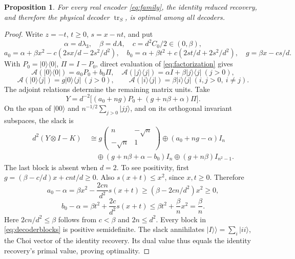 \documentclass[11pt]{article}
\newcommand{\tr}{\operatorname{tr}}
\newcommand{\ket}[1]{\lvert#1\rangle}
\newcommand{\bra}[1]{\langle#1\rvert}
\newtheorem{proposition}{Proposition}
\begin{document}
\begin{proposition}\label{prop:decoder}
For every real encoder \eqref{eq:family}, the identity reduced recovery,
and therefore the physical decoder $\tr_S$, is optimal among all decoders.
\end{proposition}
\begin{proof}
Write $z=-t$, $t\ge0$, $s=x-nt$, and put
\[
 \alpha=d\lambda_3,\quad\beta=dA,\quad c=d^2C_0/2\in(0,\beta),
\]
\[
 a_0=\alpha+\beta x^2-c(2sx/d-2s^2/d^2),\quad
 b_0=\alpha+\beta t^2+c(2st/d+2s^2/d^2),\quad
 g=\beta x-cs/d.
\]
With $P_0=\ket0\bra0$, $\Pi=I-P_0$, direct evaluation of
\eqref{eq:factorization} gives
\[
 \mathcal A(\ket0\bra0)=a_0P_0+b_0\Pi,\quad
 \mathcal A(\ket j\bra j)=\alpha I+\beta\ket j\bra j\ (j>0),
\]
\[
 \mathcal A(\ket0\bra j)=g\ket0\bra j\ (j>0),\qquad
 \mathcal A(\ket i\bra j)=\beta\ket i\bra j\ (i,j>0,\ i\ne j).
\]
The adjoint relations determine the remaining matrix units. Take
\begin{equation}\label{eq:Y}
 Y=d^{-2}\big[(a_0+ng)P_0+(g+n\beta+\alpha)\Pi\big].
\end{equation}
On the span of $\ket{00}$ and $n^{-1/2}\sum_{j>0}\ket{jj}$,
and on its orthogonal invariant subspaces, the slack is
\begin{equation}\label{eq:decoderblocks}
 \begin{aligned}
 d^2(Y\otimes I-K)\ &\cong
 g\begin{pmatrix}n&-\sqrt n\\-\sqrt n&1\end{pmatrix}
 \oplus(a_0+ng-\alpha)I_n\\
 &\quad\oplus(g+n\beta+\alpha-b_0)I_n
 \oplus(g+n\beta)I_{n^2-1}.
 \end{aligned}
\end{equation}
The last block is absent when $d=2$. To see positivity, first
$g=(\beta-c/d)x+cnt/d\ge0$. Also
$s(x+t)\le x^2$, since $x,t\ge0$. Therefore
\[
 a_0-\alpha=\beta x^2-\frac{2cn}{d^2}s(x+t)
 \ge(\beta-2cn/d^2)x^2\ge0,
\]
\[
 b_0-\alpha=\beta t^2+\frac{2c}{d^2}s(x+t)
 \le\beta t^2+\frac{\beta}{n}x^2=\frac\beta n.
\]
Here $2cn/d^2\le\beta$ follows from $c<\beta$ and $2n\le d^2$.
Every block in \eqref{eq:decoderblocks} is positive semidefinite.
The slack annihilates $\ket I\!\rangle=\sum_i\ket{ii}$,
the Choi vector of the identity recovery. Its dual value thus equals
the identity recovery's primal value, proving optimality.
\end{proof}
\end{document}
